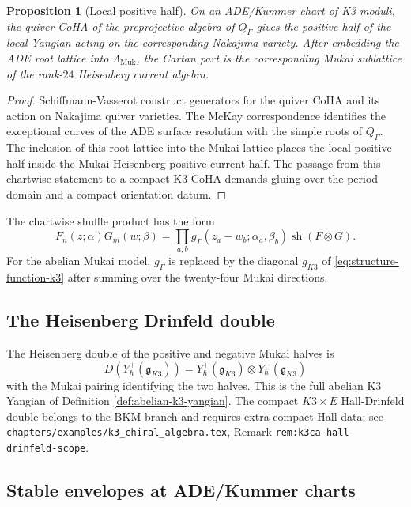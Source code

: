 \documentclass[11pt]{article}
\newtheorem{proposition}[theorem]{Proposition}
\theoremstyle{definition}
\renewcommand{\gg}{\mathfrak{g}}
\newcommand{\Lmuk}{\Lambda_{\mathrm{Muk}}}
\newcommand{\Yplus}{Y_\hbar^{+}(\gg_{K3})}
\newcommand{\Yminus}{Y_\hbar^{-}(\gg_{K3})}
\begin{document}
\begin{proposition}[Local positive half]
\label{prop:local-positive-half}
On an ADE/Kummer chart of K3 moduli, the quiver CoHA of the
preprojective algebra of $Q_\Gamma$ gives the positive half of the local
Yangian acting on the corresponding Nakajima variety. After embedding the
ADE root lattice into $\Lmuk$, the Cartan part is the corresponding
Mukai sublattice of the rank-$24$ Heisenberg current algebra.
\end{proposition}

\begin{proof}
Schiffmann-Vasserot construct generators for the quiver CoHA and its
action on Nakajima quiver varieties. The McKay correspondence identifies
the exceptional curves of the ADE surface resolution with the simple
roots of $Q_\Gamma$. The inclusion of this root lattice into the Mukai
lattice places the local positive half inside the Mukai-Heisenberg
positive current half. The passage from this chartwise statement to a
compact K3 CoHA demands gluing over the period domain and a compact
orientation datum.
\end{proof}

The chartwise shuffle product has the form
\begin{equation}
\label{eq:shuffle-product}
  F_n(z;\alpha)G_m(w;\beta)
  =
  \prod_{a,b}g_{\Gamma}(z_a-w_b;\alpha_a,\beta_b)
  \operatorname{sh}(F\otimes G).
\end{equation}
For the abelian Mukai model, $g_\Gamma$ is replaced by the diagonal
$g_{K3}$ of \eqref{eq:structure-function-k3} after summing over the
twenty-four Mukai directions.

\subsection{The Heisenberg Drinfeld double}

The Heisenberg double of the positive and negative Mukai halves is
\begin{equation}
\label{eq:drinfeld-double-k3}
  D(\Yplus)=\Yplus\otimes\Yminus
\end{equation}
with the Mukai pairing identifying the two halves. This is the full
abelian K3 Yangian of Definition \ref{def:abelian-k3-yangian}. The compact
$K3\times E$ Hall-Drinfeld double belongs to the BKM branch and requires
extra compact Hall data; see
\texttt{chapters/examples/k3\_chiral\_algebra.tex},
Remark \texttt{rem:k3ca-hall-drinfeld-scope}.

\subsection{Stable envelopes at ADE/Kummer charts}
\end{document}
